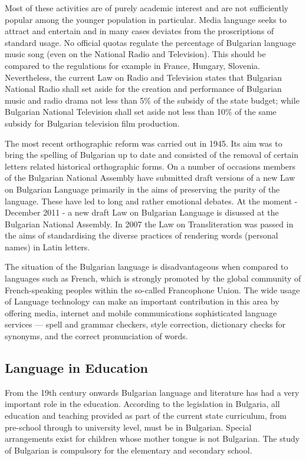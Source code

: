 \documentclass[]{../../metanetpaper}
\begin{document}
\begin{multicols}{2}
Most of these activities are of purely academic interest and are not sufficiently popular among the younger population in particular. Media language seeks to attract and entertain and in many cases deviates from the proscriptions of standard usage. No official quotas regulate the percentage of Bulgarian language music song (even on the National Radio and Television). This should be compared to the regulations for example in France, Hungary, Slovenia. Nevertheless, the current Law on Radio and Television states that Bulgarian National Radio shall set aside for the creation and performance of Bulgarian music and radio drama not less than 5\% of the subsidy of the state budget; while Bulgarian National Television shall set aside not less than 10\% of the same subsidy for Bulgarian television film production. 

The most recent orthographic reform was carried out in 1945. Its aim was to bring the spelling of Bulgarian up to date and consisted of the removal of certain letters related historical orthographic forms. On a number of occasions members of the Bulgarian National Assembly have submitted draft versions of a new Law on Bulgarian Language primarily in the aims of preserving the purity of the language. These have led to long and rather emotional debates. At the moment - December 2011 - a new draft Law on Bulgarian Language is disussed at the Bulgarian National Assembly.  In 2007 the Law on Transliteration was passed in the aims of standardising the diverse practices of rendering words (personal names) in Latin letters.

The situation of the Bulgarian language is disadvantageous when compared to languages such as French, which is strongly promoted by the global community of French-speaking peoples within the so-called Francophone Union. The wide usage of Language technology can make an important contribution in this area by offering media, internet and mobile communications sophisticated language services — spell and grammar checkers, style correction, dictionary checks for synonyms, and the correct pronunciation of words.

\subsection{Language in Education}

From the 19th century onwards Bulgarian language and literature has had a very important role in the education. According to the legislation in Bulgaria, all education and teaching provided as part of the current state curriculum, from pre-school through to university level, must be in Bulgarian. Special arrangements exist for children whose mother tongue is not Bulgarian. The study of Bulgarian is compulsory for the elementary and secondary school.


\end{multicols}
\end{document}

